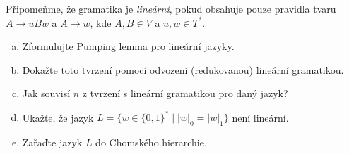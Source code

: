 \documentclass[a4paper,12pt]{amsart}
\begin{document}
\medskip\begin{problem}
    
    Připomeňme, že gramatika je \emph{lineární}, pokud obsahuje pouze pravidla tvaru $A\to uBw$ a $A\to w$, kde $A,B\in V$ a $u,w\in T^*$.
    
    \bigskip
    
    \begin{enumerate}[(a)]
        \setlength\itemsep{1em}
        \item Zformulujte Pumping lemma pro lineární jazyky.
        \item Dokažte toto tvrzení pomocí odvození (redukovanou) lineární gramatikou.
        \item Jak souvisí $n$ z tvrzení s lineární gramatikou pro daný jazyk?
        \item Ukažte, že jazyk $L=\{w\in \{0,1\}^*\mid |w|_0=|w|_1\}$ není lineární.
        \item Zařaďte jazyk $L$ do Chomského hierarchie.
    \end{enumerate}
    
\end{problem}
\end{document}
